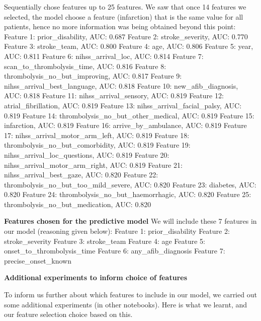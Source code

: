Sequentially chose features up to 25 features. We saw that once 14 features we selected, the model choose a feature (infarction) that is the same value for all patients, hence no more information was being obtained beyond this point:
Feature  1: prior\_disability, AUC: 0.687
Feature  2: stroke\_severity, AUC: 0.770
Feature  3: stroke\_team, AUC: 0.800
Feature  4: age, AUC: 0.806
Feature  5: year, AUC: 0.811
Feature  6: nihss\_arrival\_loc, AUC: 0.814
Feature  7: scan\_to\_thrombolysis\_time, AUC: 0.816
Feature  8: thrombolysis\_no\_but\_improving, AUC: 0.817
Feature  9: nihss\_arrival\_best\_language, AUC: 0.818
Feature 10: new\_afib\_diagnosis, AUC: 0.818
Feature 11: nihss\_arrival\_sensory, AUC: 0.819
Feature 12: atrial\_fibrillation, AUC: 0.819
Feature 13: nihss\_arrival\_facial\_palsy, AUC: 0.819
Feature 14: thrombolysis\_no\_but\_other\_medical, AUC: 0.819
Feature 15: infarction, AUC: 0.819
Feature 16: arrive\_by\_ambulance, AUC: 0.819
Feature 17: nihss\_arrival\_motor\_arm\_left, AUC: 0.819
Feature 18: thrombolysis\_no\_but\_comorbidity, AUC: 0.819
Feature 19: nihss\_arrival\_loc\_questions, AUC: 0.819
Feature 20: nihss\_arrival\_motor\_arm\_right, AUC: 0.819
Feature 21: nihss\_arrival\_best\_gaze, AUC: 0.820
Feature 22: thrombolysis\_no\_but\_too\_mild\_severe, AUC: 0.820
Feature 23: diabetes, AUC: 0.820
Feature 24: thrombolysis\_no\_but\_haemorrhagic, AUC: 0.820
Feature 25: thrombolysis\_no\_but\_medication, AUC: 0.820

\textbf{Features chosen for the predictive model}
We will include these 7 features in our model (reasoning given below):
Feature  1: prior\_disability
Feature  2: stroke\_severity
Feature  3: stroke\_team
Feature  4: age
Feature  5: onset\_to\_thrombolysis\_time
Feature  6: any\_afib\_diagnosis
Feature  7: precise\_onset\_known

\textbf{Additional experiments to inform choice of features}

To inform us further about which features to include in our model, we carried out some additional experiments (in other notebooks). Here is what we learnt, and our feature selection choice based on this.

